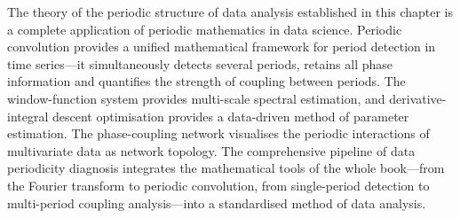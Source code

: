\begin{remark}
The theory of the periodic structure of data analysis established in this chapter is a complete application of periodic mathematics in data science. Periodic convolution provides a unified mathematical framework for period detection in time series---it simultaneously detects several periods, retains all phase information and quantifies the strength of coupling between periods. The window-function system provides multi-scale spectral estimation, and derivative-integral descent optimisation provides a data-driven method of parameter estimation. The phase-coupling network visualises the periodic interactions of multivariate data as network topology. The comprehensive pipeline of data periodicity diagnosis integrates the mathematical tools of the whole book---from the Fourier transform to periodic convolution, from single-period detection to multi-period coupling analysis---into a standardised method of data analysis.
\end{remark}

